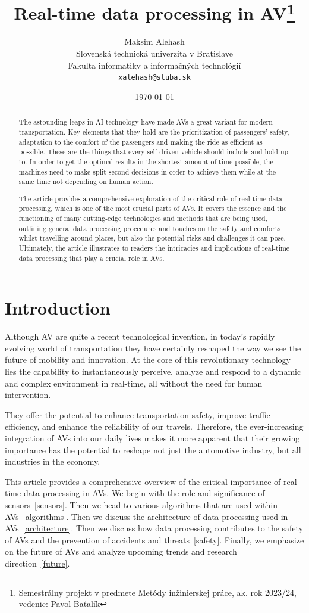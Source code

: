 \documentclass[10pt,oneside,english,a4paper]{article}
\title{Real-time data processing in AV\thanks{Semestrálny projekt v predmete Metódy inžinierskej práce, ak. rok 2023/24, vedenie: Pavol Baťalík}} %
\author{Maksim Alehash\\[2pt]
	{\small Slovenská technická univerzita v Bratislave}\\
	{\small Fakulta informatiky a informačných technológií}\\
	{\small \texttt{xalehash@stuba.sk}}
	}
\date{\small\today} %
\begin{document}
\maketitle

\begin{abstract}
The astounding leaps in AI technology have made AVs a great variant for modern transportation. Key elements that they hold are the prioritization of passengers' safety, adaptation to the comfort of the passengers and making the ride as efficient as possible. These are the things that every self-driven vehicle should include and hold up to. In order to get the optimal results in the shortest amount of time possible, the machines need to make split-second decisions in order to achieve them while at the same time not depending on human action. 
\par The article provides a comprehensive exploration of the critical role of real-time data processing, which is one of the most crucial parts of AVs. It covers the essence and the functioning of many cutting-edge technologies and methods that are being used, outlining general data processing procedures and touches on the safety and comforts whilst travelling around places, but also the potential risks and challenges it can pose. Ultimately, the article illustrates to readers the intricacies and implications of real-time data processing that play a crucial role in AVs.

\end{abstract}

\newpage\section{Introduction}

\indent Although AV are quite a recent technological invention, in today's rapidly evolving world of transportation they have certainly reshaped the way we see the future of mobility and innovation. At the core of this revolutionary technology lies the capability to instantaneously perceive, analyze and respond to a dynamic and complex environment in real-time, all without the need for human intervention. 
\par They offer the potential to enhance transportation safety, improve traffic efficiency, and enhance the reliability of our travels. Therefore, the ever-increasing integration of AVs into our daily lives makes it more apparent that their growing importance has the potential to reshape not just the automotive industry, but all industries in the economy. 
\par This article provides a comprehensive overview of the critical importance of real-time data processing in AVs. We begin with the role and significance of sensors~\eqref{sensors}. 
Then we head to various algorithms that are used within AVs~\eqref{algorithms}. Then we discuss the architecture of data processing used in AVs~\eqref{architecture}. Then we discuss how data processing contributes to the safety of AVs and the prevention of accidents and threats~\eqref{safety}. Finally, we emphasize on the future of AVs and analyze upcoming trends and research direction~\eqref{future}.
\end{document}
